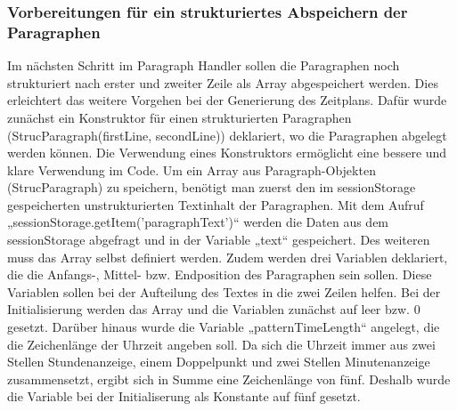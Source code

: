 {\subsubsection{Vorbereitungen für ein strukturiertes Abspeichern der Paragraphen}
Im nächsten Schritt im Paragraph Handler sollen die Paragraphen noch strukturiert nach erster und zweiter Zeile als Array abgespeichert werden. Dies erleichtert das weitere Vorgehen bei der Generierung des Zeitplans. Dafür wurde zunächst ein Konstruktor für einen strukturierten Paragraphen (StrucParagraph(firstLine, secondLine)) deklariert, wo die Paragraphen abgelegt werden können. Die Verwendung eines Konstruktors ermöglicht eine bessere und klare Verwendung im Code. Um ein Array aus Paragraph-Objekten (StrucParagraph) zu speichern, benötigt man zuerst den im sessionStorage gespeicherten unstrukturierten Textinhalt der Paragraphen. Mit dem Aufruf „sessionStorage.getItem('paragraphText')“ werden die Daten aus dem sessionStorage abgefragt und in der Variable „text“ gespeichert. Des weiteren muss das Array selbst definiert werden. Zudem werden drei Variablen deklariert, die die Anfangs-, Mittel- bzw. Endposition des Paragraphen sein sollen. Diese Variablen sollen bei der Aufteilung des Textes in die zwei Zeilen helfen. Bei der Initialisierung werden das Array und die Variablen zunächst auf leer bzw. 0 gesetzt. Darüber hinaus wurde die Variable „patternTimeLength“ angelegt, die die Zeichenlänge der Uhrzeit angeben soll. Da sich die Uhrzeit immer aus zwei Stellen Stundenanzeige, einem Doppelpunkt und zwei Stellen Minutenanzeige zusammensetzt, ergibt sich in Summe eine Zeichenlänge von fünf. Deshalb wurde die Variable bei der Initialiserung als Konstante auf fünf gesetzt.

}
